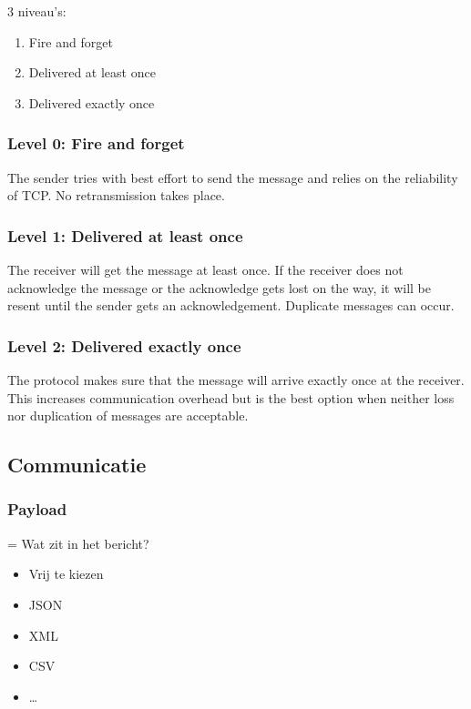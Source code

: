 \documentclass{article}
\begin{document}
3 niveau's: 
\begin{enumerate}
    \item Fire and forget
    \item Delivered at least once
    \item Delivered exactly once
\end{enumerate}

\subsubsection{Level 0: Fire and forget}

The sender tries with best effort to send the message and relies
on the reliability of TCP. No retransmission takes place.

\subsubsection{Level 1: Delivered at least once}

The receiver will get the message at least once. If the receiver
does not acknowledge the message or the acknowledge gets lost on the way, it will be
resent until the sender gets an acknowledgement. Duplicate messages can occur.

\subsubsection{Level 2: Delivered exactly once}

The protocol makes sure that the message will arrive exactly once
at the receiver. This increases communication overhead but is the best option when
neither loss nor duplication of messages are acceptable.

\subsection{Communicatie}

\subsubsection{Payload}
= Wat zit in het bericht?

\begin{itemize}
    \item Vrij te kiezen
    \item JSON
    \item XML
    \item CSV
    \item \dots
\end{itemize}
\end{document}
